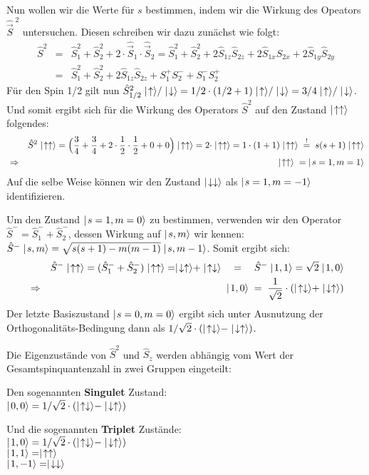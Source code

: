 Nun wollen wir die Werte für $s$ bestimmen, indem wir die Wirkung des Opeators $\hat{\vec{S}}^{\;2}$ untersuchen. Diesen schreiben wir dazu zunächst wie folgt: 
\begin{eqnarray*}
	\hat{S}^2 &=& \hat{S}_1^2 + \hat{S}_2^2 + 2\cdot\hat{\vec{S}}_1\cdot\hat{\vec{S}}_2 = \hat{S}_1^2 + \hat{S}_2^2 + 2\hat{S}_{1z}\hat{S}_{2z} +2 \hat{S}_{1x} \hat{S}_{2x} + 2\hat{S}_{1y}\hat{S}_{2y} 
	\\
	&=& \hat{S}_1^2 + \hat{S}_2^2 + 2\hat{S}_{1z}\hat{S}_{2z}+S^{+}_1S^{-}_2 + S^{-}_1 S^+_2
\end{eqnarray*}
Für den Spin 1/2 gilt nun $\hat{S}_{1/2}^2\up/\down = 1/2\cdot(1/2+1) \up/\down = 3/4 \up/\down$. Und somit ergibt sich für die Wirkung des Operators $\hat{S}^2$ auf den Zustand $\mid\!\!\!\,\,{\uparrow\uparrow}\rangle$ folgendes: 
\begin{eqnarray*}
	&& \hat{S}^2 \upup = \Big(\frac34+\frac34+2\cdot\frac12\cdot\frac12+0+0\Big) \upup = 2\cdot \upup = 1\cdot(1+1) \upup \;\overset!=\; s(s+1) \upup 
	\\
	&\Rightarrow& \upup \;=\; \ket{s=1,m=1}
\end{eqnarray*}
Auf die selbe Weise können wir den Zustand $\mid\!\!\!\,\,{\downarrow\downarrow}\rangle$ als $\mid\!\!\!\,\,{s=1,m=-1}\rangle$ identifizieren. 
 
Um den Zustand $\mid\!\!\!\,\,{s=1,m=0}\rangle$ zu bestimmen, verwenden wir den Operator $\hat{S}^-=\hat{S}_1^-+\hat{S}_2^-$, dessen Wirkung auf $\mid\!\!\!\,\,{s,m}\rangle$ wir kennen: $\hat{S}^-\mid\!\!\!\,\,{s,m}\rangle=\sqrt{s(s+1)-m(m-1)}\mid\!\!\!\,\,{s,m-1}\rangle$. Somit ergibt sich: 
\begin{eqnarray*}
	&&\hat{S}^-\upup = (\hat{S}_1^-+\hat{S}_2^-)\upup = \downup+\updown \quad=\quad \hat{S}^-\ket{1,1} = \sqrt2 \ket{1,0}
	\\
	&\Rightarrow& \ket{1,0} \;=\; \frac1{\sqrt2}\cdot(\updown+\downup)
\end{eqnarray*}
Der letzte Basiszustand $\mid\!\!\!\,\,{s=0,m=0}\rangle$ ergibt sich unter Ausnutzung der Orthogonalitäts-Bedingung dann als $1/\sqrt2\cdot(\mid\!\!\!\,\,{\uparrow\downarrow}\rangle-\mid\!\!\!\,\,{\downarrow\uparrow}\rangle)$. 

Die Eigenzustände von $\hat{S}^2$ und $\hat{S}_z$ werden abhängig vom Wert der Gesamtspinquantenzahl in zwei Gruppen eingeteilt: 
\begin{itemize1}
	\item Den sogenannten {\bf Singulet} Zustand: 
	\\$\ket{0,0}=1/\sqrt2\cdot(\updown-\downup)$
	\item Und die sogenannten {\bf Triplet} Zustände: 
	\\$\ket{1,0}=1/\sqrt2\cdot(\updown-\downup)$
	\\$\mid\!\!\!\,\,{1,1}\rangle=\mid\!\!\!\,\,{\uparrow\uparrow}\rangle$
	\\$\mid\!\!\!\,\,{1,-1}\rangle=\mid\!\!\!\,\,{\downarrow\downarrow}\rangle$
\end{itemize1}



